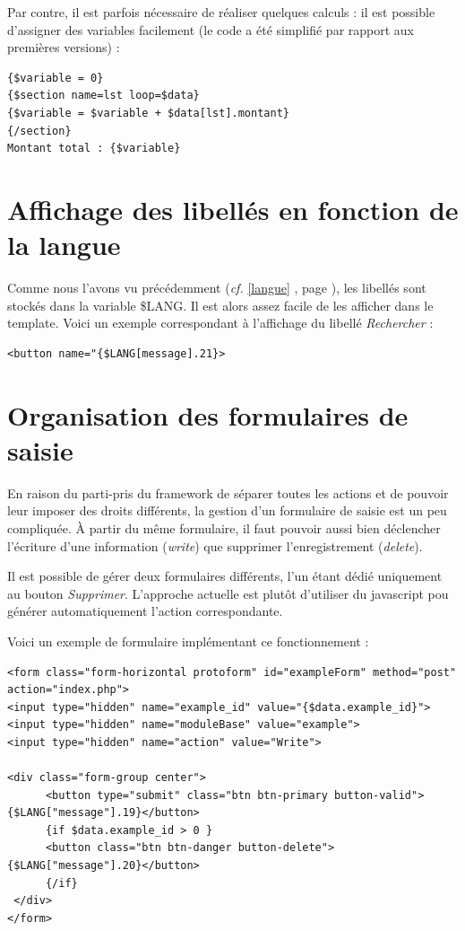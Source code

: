 Par contre, il est parfois nécessaire de réaliser quelques calculs : il est possible d'assigner des variables facilement (le code a été simplifié par rapport aux premières versions) :

\begin{lstlisting}
{$variable = 0}
{$section name=lst loop=$data}
{$variable = $variable + $data[lst].montant}
{/section}
Montant total : {$variable}
\end{lstlisting}

\section{Affichage des libellés en fonction de la langue}

Comme nous l'avons vu précédemment (\textit{cf.} \ref{langue} \textit{}, page \pageref{langue}), les libellés sont stockés dans la variable \$LANG. Il est alors assez facile de les afficher dans le template. Voici un exemple correspondant à l'affichage du libellé \textit{Rechercher} :
\begin{lstlisting}
<button name="{$LANG[message].21}>
\end{lstlisting}


\section{Organisation des formulaires de saisie}

En raison du parti-pris du framework de séparer toutes les actions et de pouvoir leur imposer des droits différents, la gestion d'un formulaire de saisie est un peu compliquée. À partir du même formulaire, il faut pouvoir aussi bien déclencher l'écriture d'une information (\textit{write}) que supprimer l'enregistrement (\textit{delete}). 

Il est possible de gérer deux formulaires différents, l'un étant dédié uniquement au bouton \textit{Supprimer}. L'approche actuelle est plutôt d'utiliser du javascript pou générer automatiquement l'action correspondante.

Voici un exemple de formulaire implémentant ce fonctionnement :

\begin{lstlisting}
<form class="form-horizontal protoform" id="exampleForm" method="post" action="index.php">
<input type="hidden" name="example_id" value="{$data.example_id}">
<input type="hidden" name="moduleBase" value="example">
<input type="hidden" name="action" value="Write">

<div class="form-group center">
      <button type="submit" class="btn btn-primary button-valid">{$LANG["message"].19}</button>
      {if $data.example_id > 0 }
      <button class="btn btn-danger button-delete">{$LANG["message"].20}</button>
      {/if}
 </div>
</form>
\end{lstlisting}

